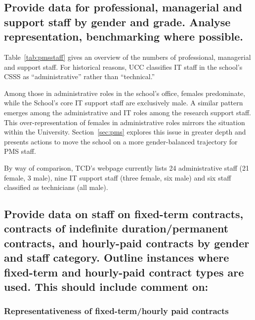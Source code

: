 \subsection{Provide data for professional, managerial and support staff by gender and grade. Analyse representation, benchmarking where possible.}



Table~\ref{tab:pmsstaff} gives an overview of the numbers of professional,
managerial and support staff. For historical reasons, UCC classifies
IT staff in the school's \ac{CSSS} as 
``administrative'' rather than ``technical.''




Among those in administrative roles in the school's office, 
females predominate, while the School's core IT support staff 
are exclusively male. A similar pattern emerges among the 
administrative and IT roles among the research support staff.
This over-representation of females in administrative roles mirrors
the situation within the University.
Section~\ref{sec:pms} explores this issue in greater depth 
and presents actions to move the school on a more gender-balanced
trajectory for PMS staff.

By way of comparison, TCD's webpage currently lists 24 administrative 
staff (21 female, 3 male), nine IT support staff (three female, six
male) and six staff classified as technicians (all male).

\subsection{Provide data on staff on fixed-term contracts, contracts of indefinite duration/permanent contracts, and hourly-paid contracts by gender and staff category. Outline instances where fixed-term and hourly-paid contract types are used. This should include comment on:}

\subsubsection{Representativeness of fixed-term/hourly paid contracts}

